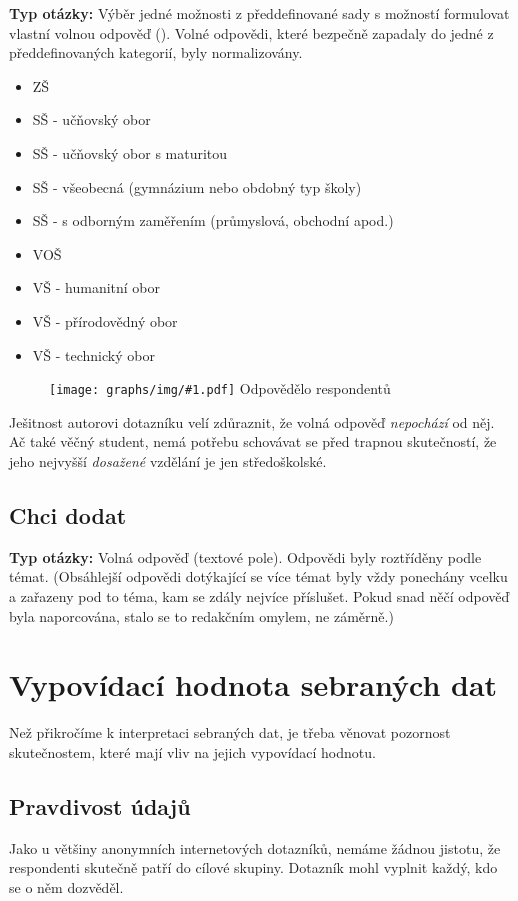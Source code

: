 \documentclass[12pt, a4paper, twoside]{article}
\newcommand{\answercount}[1]{Odpovědělo  respondentů}
\newcommand{\includegraph}[2]{
  \begin{figure}[H]
    \centering
    \textbf{#2}
    \texttt{[image: graphs/img/\#1.pdf]}
    \answercount{#1}
  \end{figure}
}
\newcommand{\qtype}{\textbf{Typ otázky:}
}
\newcommand{\pickOne}{Výběr jedné možnosti z předdefinované sady\xspace}
\newcommand{\withOther}{s možností formulovat vlastní volnou odpověď (\uv{Jiné})\xspace}
\newcommand{\freeEntry}{Volná odpověď (textové pole)}
\begin{document}
\qtype \pickOne \withOther.
Volné odpovědi, které bezpečně zapadaly do jedné z předdefinovaných
kategorií, byly normalizovány.

\begin{itemize}
\item ZŠ
\item SŠ - učňovský obor
\item SŠ - učňovský obor s maturitou
\item SŠ - všeobecná (gymnázium nebo obdobný typ školy)
\item SŠ - s odborným zaměřením (průmyslová, obchodní apod.)
\item VOŠ
\item VŠ - humanitní obor
\item VŠ - přírodovědný obor
\item VŠ - technický obor
\end{itemize}

\includegraph{moje_nejvyssi_dosazene_vzdelani}{}

{\footnotesize
Ješitnost autorovi dotazníku velí zdůraznit, že volná
odpověď  \emph{nepochází} od něj.
Ač také věčný student, nemá potřebu schovávat se před
trapnou skutečností, že jeho nejvyšší \emph{dosažené} vzdělání
je jen středoškolské.
}

\subsection{Chci dodat}

\qtype \freeEntry.
Odpovědi byly roztříděny podle témat. (Obsáhlejší odpovědi
dotýkající se více témat byly vždy ponechány vcelku
a zařazeny pod to téma, kam se zdály nejvíce příslušet.
Pokud snad něčí odpověď byla naporcována, stalo se to redakčním
omylem, ne záměrně.)



\section{Vypovídací hodnota sebraných dat}

Než přikročíme k interpretaci sebraných dat, je třeba věnovat
pozornost skutečnostem, které mají vliv na jejich vypovídací
hodnotu.

\subsection{Pravdivost údajů}

Jako u většiny anonymních internetových dotazníků,
nemáme žádnou jistotu, že respondenti skutečně patří do cílové
skupiny. Dotazník mohl vyplnit každý, kdo se o něm dozvěděl.
\end{document}
